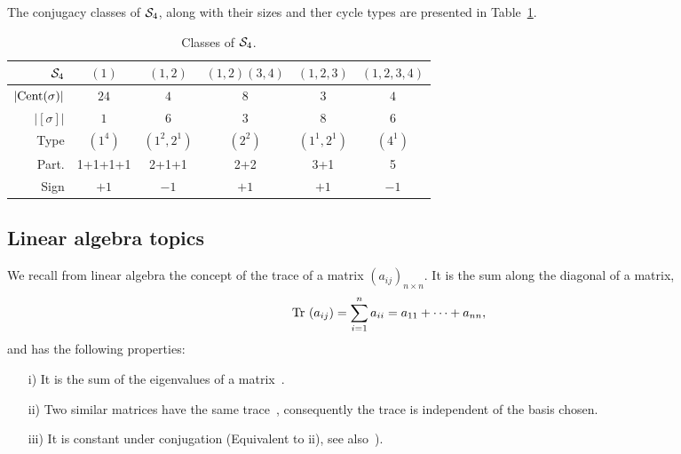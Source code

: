 \begin{example}[$\Sym_4$]
	The conjugacy classes of $\Sym_4$, along with their sizes and ther cycle types are presented in Table~\ref{table:elementsSym4}.
	\begin{table}[hbt!]
		\centering
		\begin{tabular}{r | c c c c c}
			         $\Sym_4$ & $(1)$     & $(1,2)$     & $(1,2)(3,4)$ & $(1,2,3)$   & $(1,2,3,4)$ \\ \hline
			$|\text{Cent}(\sigma)|$ & $24$      & $4$         & $8$          & $3$         & $4$         \\
			     $|[\sigma]|$ & $1$       & $6$         & $3$          & $8$         & $6$         \\
			             Type & $(1^4)$   & $(1^2,2^1)$ & $(2^2)$      & $(1^1,2^1)$ & $(4^1)$     \\
			            Part. & 1+1+1+1 & 2+1+1       & 2+2          & 3+1         & 5           \\
			             Sign & $+1$      & $-1$        & $+1$         & $+1$        & $-1$
		\end{tabular}
		\caption{Classes of $\Sym_4$.}
		\label{table:elementsSym4}
	\end{table}
\end{example}


\subsection{Linear algebra topics}

	
		We recall from linear algebra the concept of the trace of a matrix $(a_{ij})_{n \times n}$. It is the sum along the diagonal of a matrix,
		\begin{align*}
			\text{Tr }(a_{ij})= \sum_{i=1}^{n} a_{ii} = a_{11} + \dots + a_{nn},
		\end{align*}
		and has the following properties:
		\begin{proposition}\label{prop:trace}
			\begin{enumerate}
				\item[i)] It is the sum of the eigenvalues of a matrix~\cite[Cor.8.6.1.]{Nicholson}.
				\item[ii)] Two similar matrices have the same trace~\cite[Thm.5.5.1.]{Nicholson}, consequently the trace is independent of the basis chosen.
				\item[iii)] It is constant under conjugation (Equivalent to ii), see also~\cite[Ex.2.3.30.]{Nicholson}).
			\end{enumerate}
		\end{proposition}

